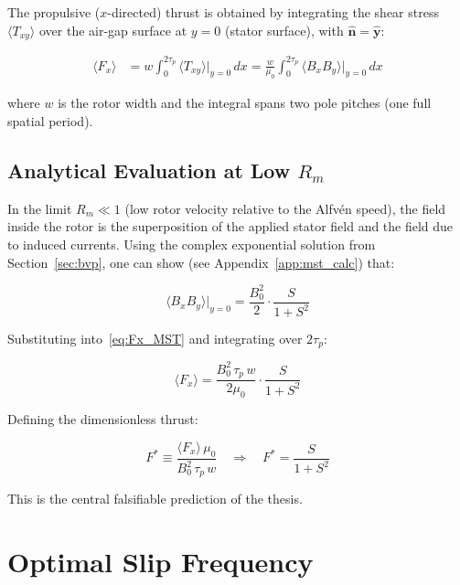 \documentclass[12pt, a4paper]{article}
\theoremstyle{plain}
\theoremstyle{definition}
\newcommand{\yhat}{\hat{\mathbf{y}}}
\newcommand{\nhat}{\hat{\mathbf{n}}}
\newcommand{\taup}{\tau_p}
\newcommand{\muZ}{\mu_0}
\newcommand{\Rm}{R_m}
\newcommand{\Fstar}{F^*}
\newcommand{\avg}[1]{\langle #1 \rangle}
\begin{document}
The propulsive ($x$-directed) thrust is obtained by integrating the shear stress
$\avg{T_{xy}}$ over the air-gap surface at $y = 0$ (stator surface), with $\nhat = \yhat$:

\begin{align}
  \avg{F_x} &= w \int_0^{2\taup} \avg{T_{xy}}\big|_{y=0}\,dx
             = \frac{w}{\muZ}\int_0^{2\taup}\avg{B_x B_y}\big|_{y=0}\,dx
  \label{eq:Fx_MST}
\end{align}

where $w$ is the rotor width and the integral spans two pole pitches (one full
spatial period).

\subsection{Analytical Evaluation at Low $\Rm$}

In the limit $\Rm \ll 1$ (low rotor velocity relative to the Alfv\'en speed), the
field inside the rotor is the superposition of the applied stator field and the
field due to induced currents. Using the complex exponential solution from
Section~\ref{sec:bvp}, one can show (see Appendix~\ref{app:mst_calc}) that:

\begin{equation}
  \avg{B_x B_y}\big|_{y=0} = \frac{B_0^2}{2}\cdot\frac{S}{1+S^2}
\end{equation}

Substituting into~\eqref{eq:Fx_MST} and integrating over $2\taup$:

\begin{tcolorbox}[colback=yellow!10, colframe=orange!60,
  title=\textbf{Closed-Form Thrust Scaling Law}]
\begin{equation}
  \boxed{
    \avg{F_x} = \frac{B_0^2\,\taup\,w}{2\muZ} \cdot \frac{S}{1+S^2}
  }
  \label{eq:Fx_MST_final}
\end{equation}
\end{tcolorbox}

Defining the dimensionless thrust:

\begin{equation}
  \Fstar \equiv \frac{\avg{F_x}\,\muZ}{B_0^2\,\taup\,w}
  \quad \Longrightarrow \quad
  \boxed{\Fstar = \frac{S}{1+S^2}}
  \label{eq:Fstar_final}
\end{equation}

This is the central falsifiable prediction of the thesis.

\section{Optimal Slip Frequency}
\label{sec:optslip}
\end{document}
